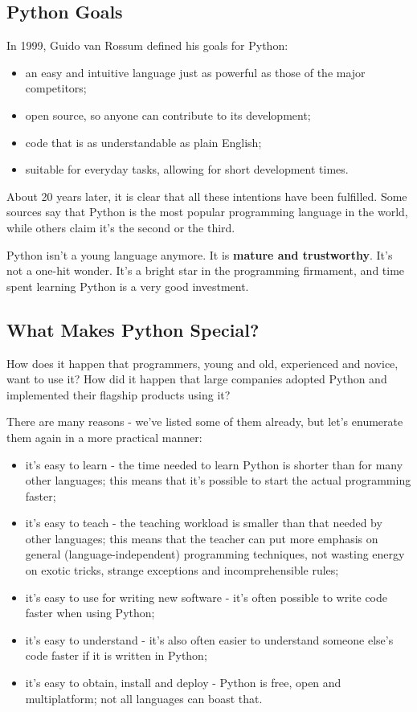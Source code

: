 \documentclass[a4paper,10pt]{article}
\begin{document}
\subsection{Python Goals}
In 1999, Guido van Rossum defined his goals for Python:
\begin{itemize}
 \item an easy and intuitive language just as powerful as those of the major competitors;
 \item open source, so anyone can contribute to its development;
 \item code that is as understandable as plain English;
 \item suitable for everyday tasks, allowing for short development times.
\end{itemize}
About 20 years later, it is clear that all these intentions have been fulfilled. Some sources say that Python is the most popular programming language in the world, while others claim it's the second or the third.

Python isn't a young language anymore. It is \textbf{mature and trustworthy}. It's not a one-hit wonder. It's a bright star in the programming firmament, and time spent learning Python is a very good investment.

\subsection{What Makes Python Special?}
How does it happen that programmers, young and old, experienced and novice, want to use it? How did it happen that large companies adopted Python and implemented their flagship products using it?

There are many reasons - we've listed some of them already, but let's enumerate them again in a more practical manner:
\begin{itemize}
 \item it's easy to learn - the time needed to learn Python is shorter than for many other languages; this means that it's possible to start the actual programming faster;
 \item it's easy to teach - the teaching workload is smaller than that needed by other languages; this means that the teacher can put more emphasis on general (language-independent) programming techniques, not wasting energy on exotic tricks, strange exceptions and incomprehensible rules;
 \item it's easy to use for writing new software - it's often possible to write code faster when using Python;
 \item it's easy to understand - it's also often easier to understand someone else's code faster if it is written in Python;
 \item it's easy to obtain, install and deploy - Python is free, open and multiplatform; not all languages can boast that.
\end{itemize}
\end{document}
